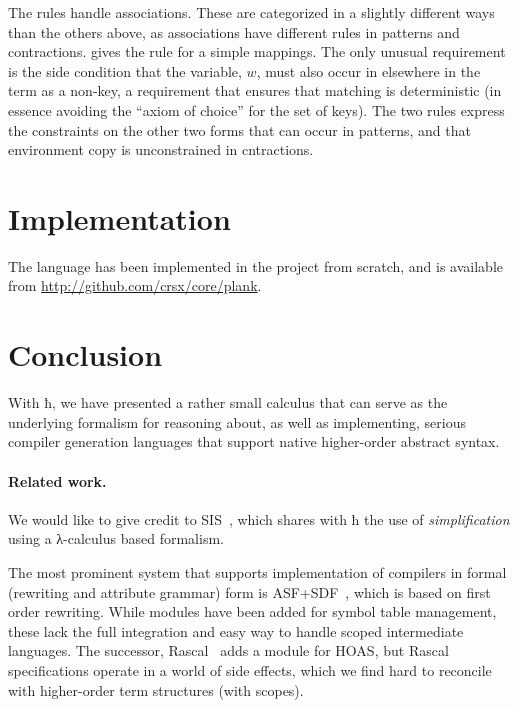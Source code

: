 \documentclass[letterpaper,10pt]{proc}
\begin{document}
The  rules handle associations. These are categorized in a slightly different ways
than the others above, as associations have different rules in patterns and contractions.
 gives the rule for a simple mappings. The only unusual requirement is the side
condition that the variable, $w$, must also occur in elsewhere in the term as a non-key, a
requirement that ensures that matching is deterministic (in essence avoiding the ``axiom of choice''
for the set of keys).
The two  rules express the constraints on the other two forms that can occur in
patterns, and  that environment copy is unconstrained in cntractions.


\section{Implementation}
\label{sec:imp}

The \plank language has been implemented in the \CRSX project from scratch, and is available from
\url{http://github.com/crsx/core/plank}.


\section{Conclusion}
\label{sec:conc}

With ħ, we have presented a rather small calculus that can serve as the underlying formalism for
reasoning about, as well as implementing, serious compiler generation languages that support native
higher-order abstract syntax.


\paragraph*{Related work.}

We would like to give credit to SIS~\cite{Mosses:daimi1979}, which shares with ħ the use of
\emph{simplification} using a λ-calculus based formalism.

The most prominent system that supports implementation of compilers in formal (rewriting and
attribute grammar) form is ASF+SDF~\cite{Brand+:toplas2002}, which is based on first order
rewriting. While modules have been added for symbol table management, these lack the full
integration and easy way to handle scoped intermediate languages. The successor,
Rascal~\cite{Bos+:eptcs2011} adds a module for HOAS, but Rascal specifications operate in a world of
side effects, which we find hard to reconcile with higher-order term structures (with scopes).
\end{document}
